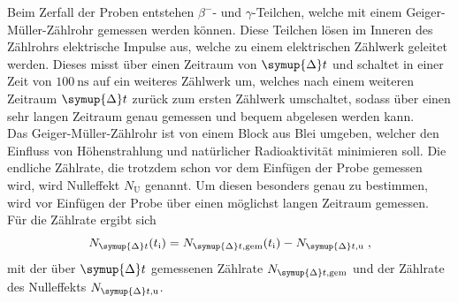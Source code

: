     Beim Zerfall der Proben entstehen $\beta^{-}$- und $\gamma$-Teilchen,
    welche mit einem Geiger-Müller-Zählrohr gemessen werden können.
    Diese Teilchen lösen im Inneren des Zählrohrs elektrische Impulse aus,
    welche zu einem elektrischen Zählwerk geleitet werden.
    Dieses misst über einen Zeitraum von $\symup{\Delta} t$
    und schaltet in einer Zeit von $\SI{100}{\nano\second}$ auf ein weiteres Zählwerk um,
    welches nach einem weiteren Zeitraum $\symup{\Delta} t$ zurück zum ersten Zählwerk umschaltet,
    sodass über einen sehr langen Zeitraum genau gemessen und bequem abgelesen werden kann.\\
    Das Geiger-Müller-Zählrohr ist von einem Block aus Blei umgeben,
    welcher den Einfluss von Höhenstrahlung und natürlicher Radioaktivität minimieren soll.
    Die endliche Zählrate,
    die trotzdem schon vor dem Einfügen der Probe gemessen wird,
    wird Nulleffekt $N_\text{U}$ genannt.
    Um diesen besonders genau zu bestimmen,
    wird vor Einfügen der Probe über einen möglichst langen Zeitraum gemessen.\\
    Für die Zählrate ergibt sich
    \begin{equation}
        \label{eqn:deltazählrate}
        N_{\symup{\Delta}t}(t_\text{i}) = N_{\symup{\Delta}t, \text{gem}}(t_\text{i}) - N_{\symup{\Delta}t, \text{u}} \; ,
    \end{equation}
    mit der über $\symup{\Delta} t$ gemessenen Zählrate $N_{\symup{\Delta}t, \text{gem}}$ und der
    Zählrate des Nulleffekts $N_{\symup{\Delta}t, \text{u}}$.
